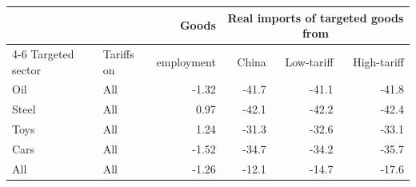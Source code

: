 \begin{tabular}{llrrrr}
\toprule
 & & Goods & \multicolumn{3}{c}{Real imports of targeted goods from} \\
\cmidrule(lr){4-6}
Targeted sector & Tariffs on & employment & China & Low-tariff & High-tariff \\
\midrule
Oil & All & -1.32 & -41.7 & -41.1 & -41.8 \\
\midrule
Steel & All & 0.97 & -42.1 & -42.2 & -42.4 \\
\midrule
Toys & All & 1.24 & -31.3 & -32.6 & -33.1 \\
\midrule
Cars & All & -1.52 & -34.7 & -34.2 & -35.7 \\
\midrule
All & All & -1.26 & -12.1 & -14.7 & -17.6 \\
\bottomrule
\end{tabular}
